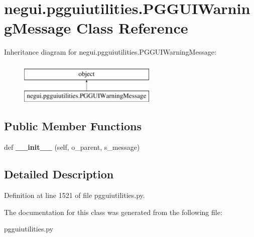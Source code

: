 \hypertarget{classnegui_1_1pgguiutilities_1_1PGGUIWarningMessage}{}\section{negui.\+pgguiutilities.\+P\+G\+G\+U\+I\+Warning\+Message Class Reference}
\label{classnegui_1_1pgguiutilities_1_1PGGUIWarningMessage}
Inheritance diagram for negui.\+pgguiutilities.\+P\+G\+G\+U\+I\+Warning\+Message\+:\begin{figure}[H]
\begin{center}
\leavevmode
\includegraphics[height=2.000000cm]{classnegui_1_1pgguiutilities_1_1PGGUIWarningMessage}
\end{center}
\end{figure}
\subsection*{Public Member Functions}
\begin{DoxyCompactItemize}
\item 
def {\bfseries \+\_\+\+\_\+init\+\_\+\+\_\+} (self, o\+\_\+parent, s\+\_\+message)\hypertarget{classnegui_1_1pgguiutilities_1_1PGGUIWarningMessage_a0ac338d8bcaa1e19be56a0b71a222d6e}{}\label{classnegui_1_1pgguiutilities_1_1PGGUIWarningMessage_a0ac338d8bcaa1e19be56a0b71a222d6e}

\end{DoxyCompactItemize}


\subsection{Detailed Description}


Definition at line 1521 of file pgguiutilities.\+py.



The documentation for this class was generated from the following file\+:\begin{DoxyCompactItemize}
\item 
pgguiutilities.\+py\end{DoxyCompactItemize}
